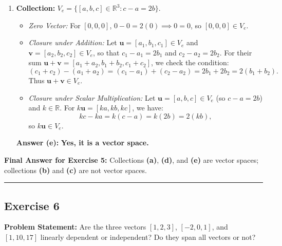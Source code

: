 \documentclass[11pt,a4paper]{article}
\begin{document}
\begin{enumerate}[label=(\alph*)]
    \item \textbf{Collection:} $V_e = \{[a, b, c] \in \mathbb{R}^3 : c - a = 2b\}$.
    \begin{itemize}
        \item \emph{Zero Vector:} For $[0, 0, 0]$, $0 - 0 = 2(0) \implies 0 = 0$, so $[0, 0, 0] \in V_e$.
        \item \emph{Closure under Addition:} Let $\mathbf{u} = [a_1, b_1, c_1] \in V_e$ and $\mathbf{v} = [a_2, b_2, c_2] \in V_e$, so that $c_1 - a_1 = 2b_1$ and $c_2 - a_2 = 2b_2$. For their sum $\mathbf{u} + \mathbf{v} = [a_1 + a_2, b_1 + b_2, c_1 + c_2]$, we check the condition:
        \[
            (c_1 + c_2) - (a_1 + a_2) = (c_1 - a_1) + (c_2 - a_2) = 2b_1 + 2b_2 = 2(b_1 + b_2).
        \]
        Thus $\mathbf{u} + \mathbf{v} \in V_e$.
        \item \emph{Closure under Scalar Multiplication:} Let $\mathbf{u} = [a, b, c] \in V_e$ (so $c - a = 2b$) and $k \in \mathbb{R}$. For $k\mathbf{u} = [ka, kb, kc]$, we have:
        \[
            kc - ka = k(c - a) = k(2b) = 2(kb),
        \]
        so $k\mathbf{u} \in V_e$.
    \end{itemize}
    \textbf{Answer (e):} \textbf{Yes, it is a vector space.}
\end{enumerate}

\textbf{Final Answer for Exercise 5:} Collections \textbf{(a)}, \textbf{(d)}, and \textbf{(e)} are vector spaces; collections \textbf{(b)} and \textbf{(c)} are not vector spaces.

\bigskip
\hrule
\bigskip

\subsection*{Exercise 6}
\textbf{Problem Statement:} Are the three vectors $[1, 2, 3]$, $[-2, 0, 1]$, and $[1, 10, 17]$ linearly dependent or independent? Do they span all vectors or not?
\end{document}
